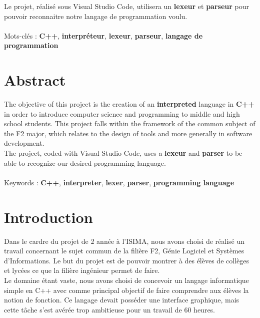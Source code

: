 \documentclass[a4paper]{article}
\begin{document}
Le projet, réalisé sous Visual Studio Code, utilisera un \textbf{lexeur} et \textbf{parseur} pour pouvoir reconnaitre notre \textbf{}{langage de programmation} voulu.
\\~\\

\noindent
Mots-clés : \textbf{C++}, \textbf{interpréteur}, \textbf{lexeur}, \textbf{parseur},  \textbf{langage de programmation}
\\[2\baselineskip]

\section{Abstract}
The objective of this project is the creation of an \textbf{interpreted} language  in \textbf{C++} in order to introduce computer science and programming to middle and high school students. This project falls within the framework of the common subject of the F2 major, which relates to the design of tools and more generally in software development.\\

The project, coded with Visual Studio Code, uses a \textbf{lexeur} and \textbf{parser} to be able to recognize our desired \textbf{}{programming language}.
\\~\\

\noindent
Keywords : \textbf{C++}, \textbf{interpreter}, \textbf{lexer}, \textbf{parser},  \textbf{programming language}

\clearpage{}


\section{Introduction}
\large
Dans le cardre du projet de 2 année à l'ISIMA, nous avons choisi de réalisé un travail concernant le sujet commun de la filière F2, Génie Logiciel et Systèmes d'Informations. Le but du projet est de pouvoir montrer à des élèves de collèges et lycées ce que la filière ingénieur permet de faire.\\

Le domaine étant vaste, nous avons choisi de concevoir un langage informatique simple en C++ avec comme principal objectif de faire comprendre aux élèves la notion de fonction. Ce langage devait posséder une interface graphique, mais cette tâche s'est avérée trop ambitieuse pour un travail de 60 heures.\\
\end{document}

